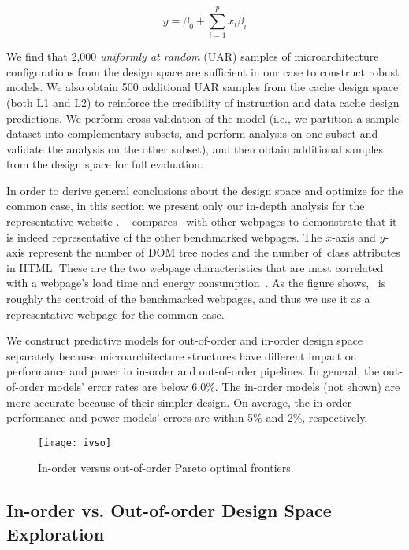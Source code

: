\begin{equation}
       y = \beta_0 + \sum_{i=1}^{p} x_i \beta_i
\label{equ:linear}
\end{equation}

We find that 2,000 \textit{uniformly at random} (UAR) samples of microarchitecture configurations from the design space are sufficient in our case to construct robust models. We also obtain 500 additional UAR samples from the cache design space (both L1 and L2) to reinforce the credibility of instruction and data cache design predictions. We perform cross-validation of the model (i.e., we partition a sample dataset into complementary subsets, and perform analysis on one subset and validate the analysis on the other subset), and then obtain additional samples from the design space for full evaluation.

In order to derive general conclusions about the design space and optimize for the common case, in this section we present only our in-depth analysis for the representative website . ~ compares~ with other webpages to demonstrate that it is indeed representative of the other benchmarked webpages. The $x$-axis and $y$-axis represent the number of DOM tree nodes and the number of~\textsf{class} attributes in HTML. These are the two webpage characteristics that are most correlated with a webpage's load time and energy consumption~\cite{big-little}. As the figure shows,~ is roughly the centroid of the benchmarked webpages, and thus we use it as a representative webpage for the common case.

We construct predictive models for out-of-order and in-order design space separately because microarchitecture structures have different impact on performance and power in in-order and out-of-order pipelines. In general, the out-of-order models' error rates are below 6.0\%. The in-order models (not shown) are more accurate because of their simpler design. On average, the in-order performance and power models' errors are within 5\% and 2\%, respectively.

\begin{figure}[t]
  \centering
  \texttt{[image: ivso]}
  \caption{In-order versus out-of-order Pareto optimal frontiers.}
  \label{fig:ivso}
\end{figure}

\subsection{In-order vs. Out-of-order Design Space Exploration}
\label{sec:arch:customization:core}

